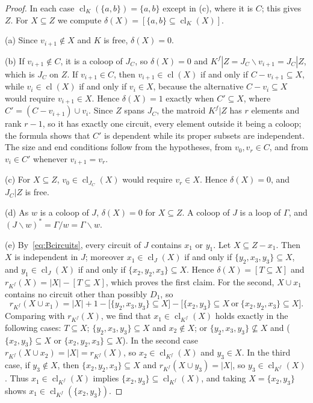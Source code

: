 \documentclass[11pt]{amsart}
\theoremstyle{definition}
\theoremstyle{remark}
\numberwithin{equation}{section}
\newcommand{\cl}{\operatorname{cl}}
\begin{document}
\begin{proof}
In each case $\cl_K(\{a,b\})=\{a,b\}$ except in (c), where it is $C$; this gives $Z$. For $X\subseteq Z$ we compute $\delta(X)=[\{a,b\}\subseteq\cl_K(X)]$.

(a) Since $v_{i+1}\notin X$ and $K$ is free, $\delta(X)=0$.

(b) If $v_{i+1}\notin C$, it is a coloop of $J_C$, so $\delta(X)=0$ and $K^f|Z=J_C\backslash v_{i+1}=J_C|Z$, which is $J_{C}$ on $Z$. If $v_{i+1}\in C$, then $v_{i+1}\in\cl(X)$ if and only if $C-v_{i+1}\subseteq X$, while $v_i\in\cl(X)$ if and only if $v_i\in X$, because the alternative $C-v_i\subseteq X$ would require $v_{i+1}\in X$. Hence $\delta(X)=1$ exactly when $C'\subseteq X$, where $C'=(C-v_{i+1})\cup v_i$. Since $Z$ spans $J_C$, the matroid $K^f|Z$ has $r$ elements and rank $r-1$, so it has exactly one circuit, every element outside it being a coloop; the formula shows that $C'$ is dependent while its proper subsets are independent. The size and end conditions follow from the hypotheses, from $v_0,v_r\in C$, and from $v_i\in C'$ whenever $v_{i+1}=v_r$.

(c) For $X\subseteq Z$, $v_0\in\cl_{J_C}(X)$ would require $v_r\in X$. Hence $\delta(X)=0$, and $J_C|Z$ is free.

(d) As $w$ is a coloop of $J$, $\delta(X)=0$ for $X\subseteq Z$. A coloop of $J$ is a loop of $\Gamma$, and $(J\backslash w)^*=\Gamma/w=\Gamma\backslash w$.

(e) By~\eqref{eq:Bcircuits}, every circuit of $J$ contains $x_1$ or $y_1$. Let $X\subseteq Z-x_1$. Then $X$ is independent in $J$; moreover $x_1\in\cl_J(X)$ if and only if $\{y_2,x_3,y_3\}\subseteq X$, and $y_1\in\cl_J(X)$ if and only if $\{x_2,y_2,x_3\}\subseteq X$. Hence $\delta(X)=[T\subseteq X]$ and $r_{K^f}(X)=|X|-[T\subseteq X]$, which proves the first claim. For the second, $X\cup x_1$ contains no circuit other than possibly $D_1$, so
\[
r_{K^f}(X\cup x_1)=|X|+1-\big[\{y_2,x_3,y_3\}\subseteq X\big]-\big[\{x_2,y_3\}\subseteq X\ \text{or}\ \{x_2,y_2,x_3\}\subseteq X\big].
\]
Comparing with $r_{K^f}(X)$, we find that $x_1\in\cl_{K^f}(X)$ holds exactly in the following cases: $T\subseteq X$; $\{y_2,x_3,y_3\}\subseteq X$ and $x_2\notin X$; or $\{y_2,x_3,y_3\}\not\subseteq X$ and ($\{x_2,y_3\}\subseteq X$ or $\{x_2,y_2,x_3\}\subseteq X$). In the second case $r_{K^f}(X\cup x_2)=|X|=r_{K^f}(X)$, so $x_2\in\cl_{K^f}(X)$ and $y_3\in X$. In the third case, if $y_3\notin X$, then $\{x_2,y_2,x_3\}\subseteq X$ and $r_{K^f}(X\cup y_3)=|X|$, so $y_3\in\cl_{K^f}(X)$. Thus $x_1\in\cl_{K^f}(X)$ implies $\{x_2,y_3\}\subseteq\cl_{K^f}(X)$, and taking $X=\{x_2,y_3\}$ shows $x_1\in\cl_{K^f}(\{x_2,y_3\})$.
\end{proof}
\end{document}
